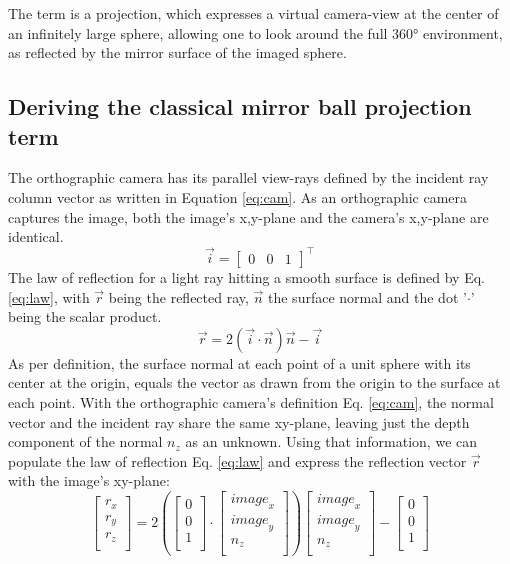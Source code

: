 \documentclass[10pt]{article}
\begin{document}
\begin{multicols}{2}
The term is a projection, which expresses a virtual camera-view at the center of an infinitely large sphere, allowing one to look around the full 360° environment, as reflected by the mirror surface of the imaged sphere.

\subsection{Deriving the classical mirror ball projection term}
The orthographic camera has its parallel view-rays defined by the incident ray column vector as written in Equation \ref{eq:cam}. As an orthographic camera captures the image, both the image's x,y-plane and the camera's x,y-plane are identical.
\begin{equation}\label{eq:cam}
	\vec{i}=\begin{bmatrix}
		0 & 0 & 1
	\end{bmatrix}^\intercal
\end{equation}
The law of reflection for a light ray hitting a smooth surface is defined by Eq. \ref{eq:law}, with $\vec{r}$ being the reflected ray, $\vec{n}$ the surface normal and the dot '$\cdot$' being the scalar product.
\begin{equation}\label{eq:law}
	\vec{r}=2\left(\vec{i}\cdot\vec{n}\right)\vec{n}-\vec{i}
\end{equation}
As per definition, the surface normal at each point of a unit sphere with its center at the origin, equals the vector as drawn from the origin to the surface at each point. With the orthographic camera's definition Eq. \ref{eq:cam}, the normal vector and the incident ray share the same xy-plane, leaving just the depth component of the normal $n_z$ as an unknown. Using that information, we can populate the law of reflection Eq. \ref{eq:law} and express the reflection vector $\vec{r}$ with the image's xy-plane:
\begin{equation}\label{eq:insert}
	\left[\begin{matrix}r_x\\r_y\\r_z\\\end{matrix}\right]=2\left(\left[\begin{matrix}0\\0\\1\\\end{matrix}\right]\cdot\left[\begin{matrix}{image}_x\\{image}_y\\n_z\\\end{matrix}\right]\right)\left[\begin{matrix}{image}_x\\{image}_y\\n_z\\\end{matrix}\right]-\left[\begin{matrix}0\\0\\1\\\end{matrix}\right]

\end{equation}
\end{multicols}
\end{document}
